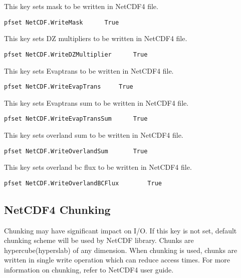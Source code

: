 {This key sets mask to be written in NetCDF4 file.}
\begin{display}\begin{verbatim}
pfset NetCDF.WriteMask	    True
\end{verbatim}\end{display}

{This key sets DZ multipliers to be written in NetCDF4 file.}
\begin{display}\begin{verbatim}
pfset NetCDF.WriteDZMultiplier	    True
\end{verbatim}\end{display}

{This key sets Evaptrans to be written in NetCDF4 file.}
\begin{display}\begin{verbatim}
pfset NetCDF.WriteEvapTrans	    True
\end{verbatim}\end{display}

{This key sets Evaptrans sum to be written in NetCDF4 file.}
\begin{display}\begin{verbatim}
pfset NetCDF.WriteEvapTransSum	    True
\end{verbatim}\end{display}

{This key sets overland sum to be written in NetCDF4 file.}
\begin{display}\begin{verbatim}
pfset NetCDF.WriteOverlandSum	    True
\end{verbatim}\end{display}

{This key sets overland bc flux to be written in NetCDF4 file.}
\begin{display}\begin{verbatim}
pfset NetCDF.WriteOverlandBCFlux	    True
\end{verbatim}\end{display}

\subsection{NetCDF4 Chunking}
Chunking may have significant impact on I/O. If this key is not set, default chunking scheme will be used by NetCDF library. Chunks are hypercube(hyperslab) of any dimension. When chunking is used, chunks are written in single write operation which can reduce access times. For more information on chunking, refer to NetCDF4 user guide.


